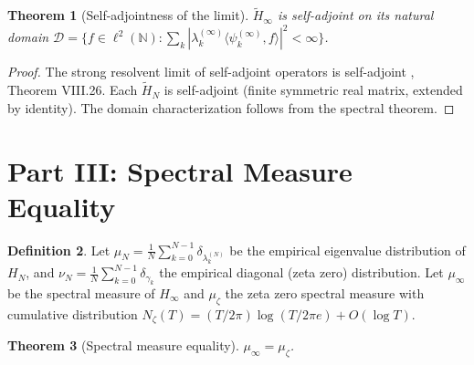 \documentclass[11pt,a4paper]{article}
\newtheorem{theorem}{Theorem}[section]
\theoremstyle{definition}
\newtheorem{definition}[theorem]{Definition}
\begin{document}
\begin{theorem}[Self-adjointness of the limit]\label{thm:sa}
$\widetilde{H}_\infty$ is self-adjoint on its natural domain
$\mathcal{D} = \{f \in \ell^2(\mathbb{N}) : \sum_k
|\lambda_k^{(\infty)}\langle \psi_k^{(\infty)}, f\rangle|^2 < \infty\}$.
\end{theorem}

\begin{proof}
The strong resolvent limit of self-adjoint operators is self-adjoint
\cite{reed1980}, Theorem VIII.26. Each $\widetilde{H}_N$ is self-adjoint
(finite symmetric real matrix, extended by identity). The domain
characterization follows from the spectral theorem.
\end{proof}

\section{Part III: Spectral Measure Equality}
\label{sec:part3}

\begin{definition}
Let $\mu_N = \frac{1}{N}\sum_{k=0}^{N-1}
\delta_{\lambda_k^{(N)}}$ be the empirical eigenvalue distribution of
$H_N$, and $\nu_N = \frac{1}{N}\sum_{k=0}^{N-1} \delta_{\gamma_k}$
the empirical diagonal (zeta zero) distribution. Let $\mu_\infty$ be
the spectral measure of $H_\infty$ and $\mu_\zeta$ the zeta zero
spectral measure with cumulative distribution
$N_\zeta(T) = (T/2\pi)\log(T/2\pi e) + O(\log T)$.
\end{definition}

\begin{theorem}[Spectral measure equality]\label{thm:measure}
$\mu_\infty = \mu_\zeta$.
\end{theorem}
\end{document}
